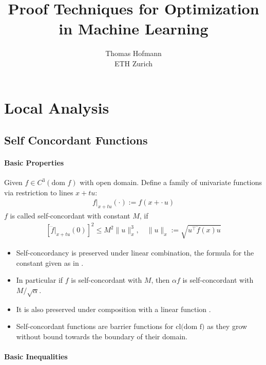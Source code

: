 \documentclass{article}
\title{Proof Techniques for Optimization \\ in Machine Learning}
\author{Thomas Hofmann\\ ETH Zurich}
\newcommand{\dom}[1]{{\text{dom $#1$}}}
\begin{document}
\maketitle

\section{Local Analysis}

\subsection{Self Concordant Functions}

\paragraph{Basic Properties}

Given $f \in C^3(\dom{f})$ with open domain. Define a family of univariate functions via restriction to lines $x + t u$:
\begin{align}
f|_{x+tu}(\cdot) := f(x + \cdot \, u)
\end{align}
$f$ is called self-concordant with constant $M$, if 
\begin{align}
\left[ \dddot f|_{x+tu}(0) \right]^2  \le M^2 \| u\|_x^{3}, \quad \| u\|_x := \sqrt{u^\top \ddot f(x) u}
\end{align}
\begin{itemize}
\setlength{\itemsep}{0mm}
\item Self-concordancy is preserved under linear combination, the formula for the constant given as in \cite[Theorem 4.1.1]{nesterov1998introductory}. 
\item In particular if $f$ is self-concordant with $M$, then $\alpha f$ is self-concordant with $M/\sqrt{\alpha}$. 
\item It is also preserved under composition with a linear function \cite[Theorem 4.1.2]{nesterov1998introductory}. 
\item Self-concordant functions are barrier functions for $\text{cl(dom f)}$ \cite[Theorem 4.1.4]{nesterov1998introductory} as they grow without bound towards the boundary of their domain.
\end{itemize}

\paragraph{Basic Inequalities}
\end{document}
